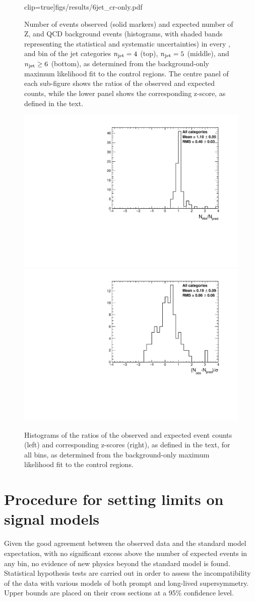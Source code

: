 \begin{figure}[!p]
clip=true]{figs/results/6jet_cr-only.pdf}\\
\caption{Number of events observed (solid markers) and expected number of Z, 
\ttw and QCD background events (histograms, with shaded bands representing the 
statistical and systematic uncertainties) in every \nb, \scalht and \mht bin of 
the jet categories $n_{\text{jet}} = 4$ (top), $n_{\text{jet}}=5$ (middle), and $n_{\text{jet}}\ge6$ 
(bottom), as determined from the background-only maximum likelihood fit to the 
control regions. 
The centre panel of each sub-figure shows the ratios of the observed and 
expected counts, while the lower panel shows the corresponding z-score, as 
defined in the text.}
\label{fig:results2}
\end{figure}

\begin{figure}[h!]
\centering
\includegraphics[width=0.49\linewidth]{figs/results/ratios_all_prefit.pdf}
\includegraphics[width=0.49\linewidth]{figs/results/pulls_all_prefit.pdf}
\caption{Histograms of the ratios of the observed and expected event counts 
(left) and corresponding z-scores (right), as defined in the text, for all 
\njnbht bins, as determined from the background-only maximum likelihood fit to 
the control regions.}
\label{fig:ratios_and_pulls}
\end{figure}

\section{Procedure for setting limits on signal models}
\label{sec:results-limitsproc}
Given the good agreement between the observed data and the standard model 
expectation, with no significant excess above the number of expected events in 
any bin, no evidence of new physics beyond the standard model is found. 
Statistical hypothesis tests are carried out in order to assess the 
incompatibility of the data with various models of both prompt and long-lived 
supersymmetry. Upper bounds are placed on their cross sections at a 95\% 
confidence level.

